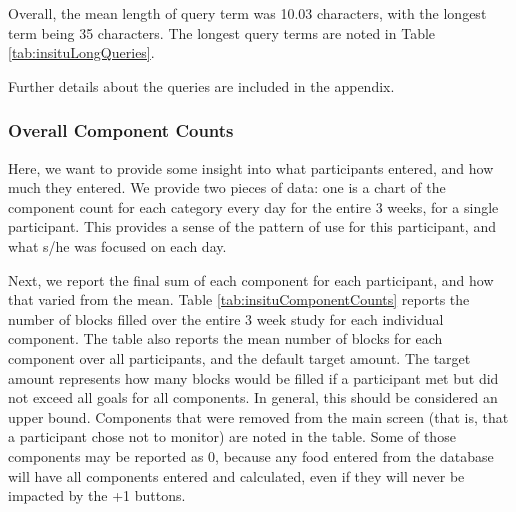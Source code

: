 Overall, the mean length of query term was 10.03 characters, with the longest term being 35 characters. The longest query terms are noted in Table \ref{tab:insituLongQueries}.

Further details about the queries are included in the appendix. 


\subsubsection{Overall Component Counts}
Here, we want to provide some insight into what participants entered, and how much they entered. We provide two pieces of data: one is a chart of the component count for each category every day for the entire 3 weeks, for a single participant. This provides a sense of the pattern of use for this participant, and what s/he was focused on each day. 

Next, we report the final sum of each component for each participant, and how that varied from the mean. Table \ref{tab:insituComponentCounts} reports the number of blocks filled over the entire 3 week study for each individual component. The table also reports the mean number of blocks for each component over all participants, and the default target amount. The target amount represents how many blocks would be filled if a participant met but did not exceed all goals for all components. In general, this should be considered an upper bound. Components that were removed from the main screen (that is, that a participant chose not to monitor) are noted in the table. Some of those components may be reported as 0, because any food entered from the database will have all components entered and calculated, even if they will never be impacted by the +1 buttons. 




